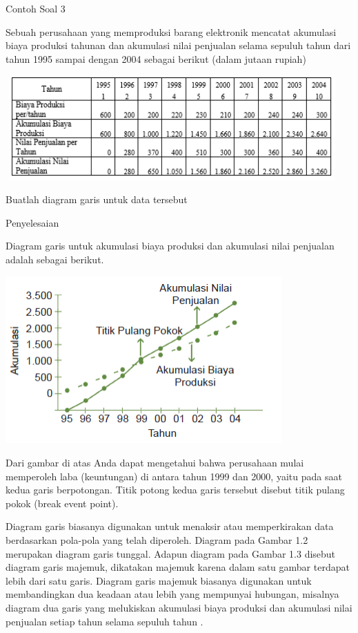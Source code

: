 \documentclass[11pt,fleqn]{book} %
\begin{document}
{Contoh Soal 3

Sebuah perusahaan yang memproduksi barang elektronik mencatat akumulasi biaya produksi tahunan dan akumulasi nilai penjualan selama sepuluh tahun dari tahun 1995 sampai dengan 2004 sebagai berikut (dalam jutaan rupiah)

\includegraphics[width = 12.8cm, height= 4cm]{Pictures/Gb5_diana.png}

Buatlah diagram garis untuk data tersebut

Penyelesaian

Diagram garis untuk akumulasi biaya produksi dan akumulasi nilai penjualan adalah sebagai berikut.

\includegraphics[width = 10.6cm, height= 6.4cm]{Pictures/Gb6_diana.png}

Dari gambar di atas Anda dapat mengetahui bahwa perusahaan mulai memperoleh laba (keuntungan) di antara tahun 1999 dan 2000, yaitu pada saat kedua garis berpotongan. Titik potong kedua garis tersebut disebut titik pulang pokok (break event point).

	Diagram garis biasanya digunakan untuk menaksir atau memperkirakan data berdasarkan pola-pola yang telah diperoleh. Diagram pada Gambar 1.2 merupakan diagram garis tunggal. Adapun diagram pada Gambar 1.3 disebut diagram garis majemuk, dikatakan majemuk karena dalam satu gambar terdapat lebih dari satu garis. Diagram garis majemuk biasanya digunakan untuk membandingkan dua keadaan atau lebih yang mempunyai hubungan, misalnya diagram dua garis yang melukiskan akumulasi biaya produksi dan akumulasi nilai penjualan setiap tahun selama sepuluh tahun .

}
\end{document}
